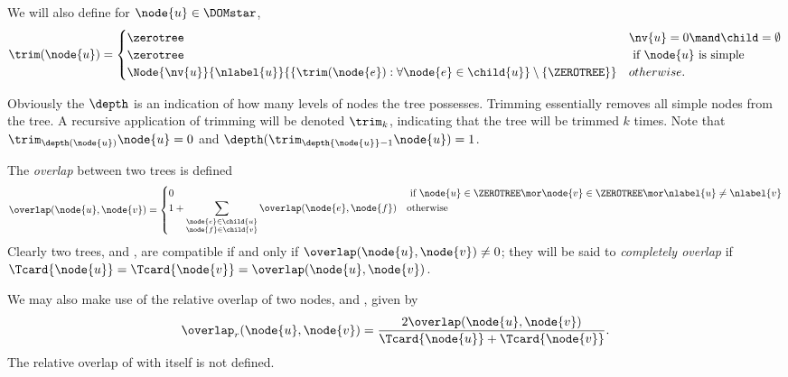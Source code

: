 \begin{definition}\label{trim}
  We will also define for \(\node{u} \in \DOMstar\),
  \begin{align*}
      \trim(\node{u}) = \begin{cases}
        \zerotree & \nv{u} = 0 \mand \child = \emptyset\\
        \zerotree & \text{ if } \node{u} \text{ is simple} \\
        \Node{\nv{u}}{\nlabel{u}}{\lbrace \trim(\node{e}): \forall\node{e}\in\child{u} \rbrace \setminus \{\ZEROTREE\}} & otherwise.
      \end{cases}
  \end{align*}
\end{definition}

Obviously the $\depth$ is an indication of how many levels of nodes
the tree possesses. Trimming essentially removes all simple nodes from the tree.
 A recursive application
of trimming will be denoted \(\trim_{k}\), indicating that the tree
 will be trimmed \(k\) times. Note that
\(\trim_{\depth(\node{u})}{\node{u}} = 0\) and
\(\depth(\trim_{\depth{\node{u}}-1}{\node{u}}) = 1\).

\begin{definition}\label{overlap}
   The \emph{overlap} between two trees is defined
   \[
     \overlap(\node{u},\node{v}) = \begin{cases}
         0 & \text{ if } \node{u} \in \ZEROTREE \mor \node{v} \in \ZEROTREE \mor \nlabel{u} \neq \nlabel{v} \\
             1 + \displaystyle\sum_{\substack{\node{e}\in\child{u} \\
                     \node{f}\in\child{v}}} \overlap(\node{e},\node{f}) & \text{otherwise}
                       \end{cases}
\]
Clearly two trees,  and , are compatible if and only if \(\overlap(\node{u},\node{v}) \neq 0 \); they will
be said to \emph{completely overlap} if \(\Tcard{\node{u}} = \Tcard{\node{v}} =
\overlap(\node{u},\node{v})\).

We may also make use of the relative overlap of two nodes,  and , given by \[\overlap_{r}(\node{u},\node{v})
= \frac{2 \overlap(\node{u},\node{v})}{\Tcard{\node{u}}+\Tcard{\node{v}}}.\] The relative overlap of  \tzerotree with itself is
not defined.
\end{definition}


